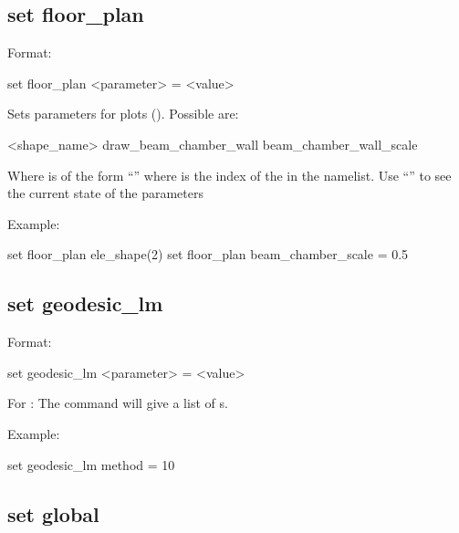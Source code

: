 {{%

\subsection{set floor_plan}
\label{s:set.floor.plan}

Format:
\begin{example}
  set floor_plan <parameter> = <value>
\end{example}


Sets parameters for  plots ().  Possible  are:
\begin{example}
  <shape_name>%
  draw_beam_chamber_wall
  beam_chamber_wall_scale
\end{example}
Where  is of the form ``'' where  is the index of
the  in the  namelist.  Use ``'' to
see the current state of the  parameters

Example:
\begin{example}
  set floor_plan ele_shape(2)%
  set floor_plan beam_chamber_scale = 0.5
\end{example}


\subsection{set geodesic_lm}
\label{s:set.geodesic.lm}

Format:
\begin{example}
  set geodesic_lm <parameter> = <value>
\end{example}

For : The  command will give a list of
s.

Example:
\begin{example}
  set geodesic_lm method = 10
\end{example}


\subsection{set global}
\label{s:set.global}

}}
